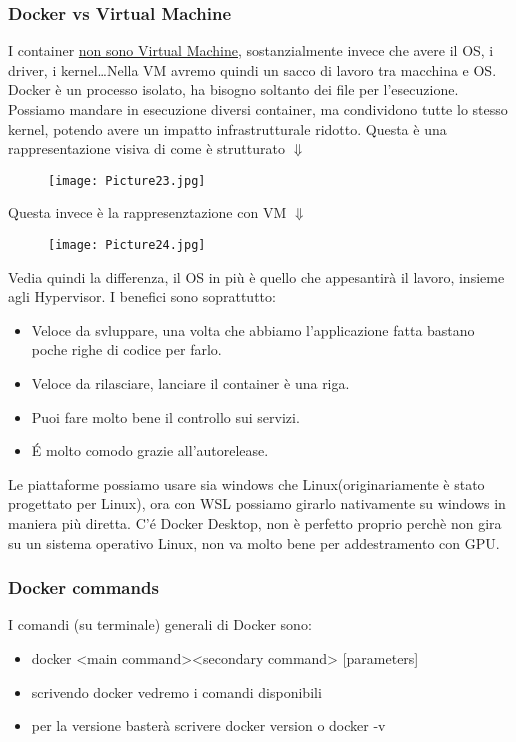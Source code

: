 \documentclass[a4paper,12pt]{article}
\begin{document}
\subsubsection{Docker vs Virtual Machine}
I container \underline{non sono Virtual Machine}, sostanzialmente invece che avere il OS, i driver, i kernel\dots Nella VM avremo quindi un sacco di lavoro tra macchina e OS. Docker è un processo isolato, 
ha bisogno soltanto dei file per l'esecuzione. Possiamo mandare in esecuzione diversi container, ma condividono tutte lo stesso kernel, potendo avere un impatto infrastrutturale ridotto. Questa è una rappresentazione visiva di come è strutturato $\Downarrow$
\begin{figure}[H]
    \centering
    \texttt{[image: Picture23.jpg]}
    \label{etichetta45}
\end{figure}
\begin{center}
    Questa invece è la rappresenztazione con VM $\Downarrow$
\end{center}
\begin{figure}[H]
    \centering
    \texttt{[image: Picture24.jpg]}
    \label{etichetta46}
\end{figure}
Vedia quindi la differenza, il OS in più è quello che appesantirà il lavoro, insieme agli Hypervisor.
I benefici sono soprattutto:
\begin{itemize}
    \item Veloce da svluppare, una volta che abbiamo l'applicazione fatta bastano poche righe di codice per farlo.
    \item Veloce da rilasciare, lanciare il container è una riga.
    \item Puoi fare molto bene il controllo sui servizi.
    \item \'{E} molto comodo grazie all'auto\-release.
\end{itemize}
Le piattaforme possiamo usare sia windows che Linux(originariamente è stato progettato per Linux), ora con WSL possiamo girarlo nativamente su windows in maniera più diretta.
C'é Docker Desktop, non è perfetto proprio perchè non gira su un sistema operativo Linux, non va molto bene per addestramento con GPU.

\subsubsection{Docker commands}
I comandi (su terminale) generali di Docker sono:
\begin{itemize}
    \item docker <main command><secondary command> [parameters]
    \item scrivendo docker vedremo i comandi disponibili
    \item per la versione basterà scrivere docker version o docker -v
\end{itemize}
\end{document}
